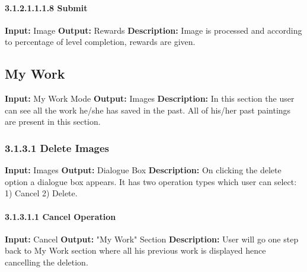 \documentclass{scrreprt}
\begin{document}
\paragraph{3.1.2.1.1.1.8 Submit}
\hfill \vspace{2.5mm} \break 
\textbf{Input:} Image \newline
\textbf{Output:} Rewards
\vspace{1mm}\newline
\textbf{Description:} \newline 
Image is processed and according to percentage of level completion, rewards are given.

\subsection{My Work}
\textbf{Input:} My Work Mode \newline
\textbf{Output:} Images
\vspace{1mm}\newline
\textbf{Description:} \newline 
In this section the user can see all the work he/she has saved in the past. All of his/her past paintings are present in this section. 

\subsubsection{3.1.3.1 Delete Images}
\textbf{Input:} Images \newline
\textbf{Output:} Dialogue Box
\vspace{1mm}\newline
\textbf{Description:} \newline 
On clicking the delete option a dialogue box appears. It has two operation types which user can select: 1) Cancel  2) Delete.

\paragraph{3.1.3.1.1 Cancel Operation}
\hfill \vspace{2.5mm} \break 
\textbf{Input:} Cancel \newline
\textbf{Output:} "My Work" Section
\vspace{1mm}\newline
\textbf{Description:} \newline 
User will go one step back to My Work section where all his previous work is displayed hence cancelling the deletion.
\end{document}
